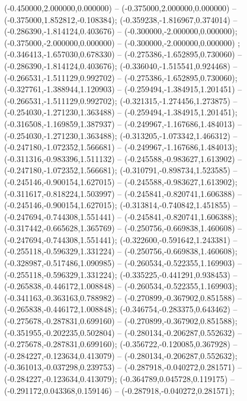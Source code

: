  (-0.450000,2.000000,0.000000) -- (-0.375000,2.000000,0.000000) -- (-0.375000,1.852812,-0.108384);
 (-0.359238,-1.816967,0.374014) -- (-0.286390,-1.814124,0.403676) -- (-0.300000,-2.000000,0.000000);
 (-0.375000,-2.000000,0.000000) -- (-0.300000,-2.000000,0.000000) ;
 (-0.346413,-1.657030,0.678330) -- (-0.275386,-1.652895,0.730060) -- (-0.286390,-1.814124,0.403676);
 (-0.336040,-1.515541,0.924468) -- (-0.266531,-1.511129,0.992702) -- (-0.275386,-1.652895,0.730060);
 (-0.327761,-1.388944,1.120903) -- (-0.259494,-1.384915,1.201451) -- (-0.266531,-1.511129,0.992702);
 (-0.321315,-1.274456,1.273875) -- (-0.254030,-1.271230,1.363488) -- (-0.259494,-1.384915,1.201451);
 (-0.316508,-1.169859,1.387937) -- (-0.249967,-1.167686,1.484013) -- (-0.254030,-1.271230,1.363488);
 (-0.313205,-1.073342,1.466312) -- (-0.247180,-1.072352,1.566681) -- (-0.249967,-1.167686,1.484013);
 (-0.311316,-0.983396,1.511132) -- (-0.245588,-0.983627,1.613902) -- (-0.247180,-1.072352,1.566681);
 (-0.310791,-0.898734,1.523585) -- (-0.245146,-0.900154,1.627015) -- (-0.245588,-0.983627,1.613902);
 (-0.311617,-0.818224,1.503997) -- (-0.245841,-0.820741,1.606388) -- (-0.245146,-0.900154,1.627015);
 (-0.313814,-0.740842,1.451855) -- (-0.247694,-0.744308,1.551441) -- (-0.245841,-0.820741,1.606388);
 (-0.317442,-0.665628,1.365769) -- (-0.250756,-0.669838,1.460608) -- (-0.247694,-0.744308,1.551441);
 (-0.322600,-0.591642,1.243381) -- (-0.255118,-0.596329,1.331224) -- (-0.250756,-0.669838,1.460608);
 (-0.328987,-0.517486,1.090985) -- (-0.260534,-0.522355,1.169903) -- (-0.255118,-0.596329,1.331224);
 (-0.335225,-0.441291,0.938453) -- (-0.265838,-0.446172,1.008848) -- (-0.260534,-0.522355,1.169903);
 (-0.341163,-0.363163,0.788982) -- (-0.270899,-0.367902,0.851588) -- (-0.265838,-0.446172,1.008848);
 (-0.346754,-0.283375,0.643462) -- (-0.275678,-0.287831,0.699160) -- (-0.270899,-0.367902,0.851588);
 (-0.351955,-0.202235,0.502804) -- (-0.280134,-0.206287,0.552632) -- (-0.275678,-0.287831,0.699160);
 (-0.356722,-0.120085,0.367928) -- (-0.284227,-0.123634,0.413079) -- (-0.280134,-0.206287,0.552632);
 (-0.361013,-0.037298,0.239753) -- (-0.287918,-0.040272,0.281571) -- (-0.284227,-0.123634,0.413079);
 (-0.364789,0.045728,0.119175) -- (-0.291172,0.043368,0.159146) -- (-0.287918,-0.040272,0.281571);
